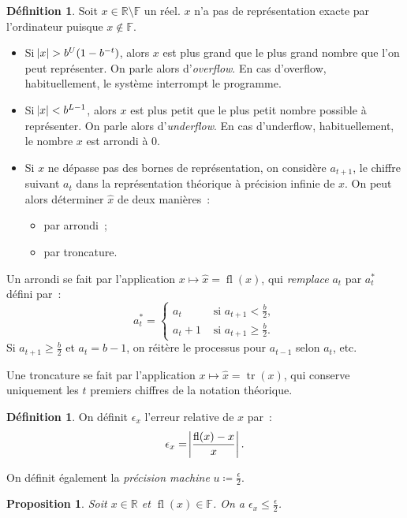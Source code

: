 \documentclass{article}
\newtheorem{prp}[thm]{Proposition}
\theoremstyle{definition}
\newtheorem{déf}[thm]{Définition}
\theoremstyle{remark}
\DeclareMathOperator{\fl}{fl}
\DeclareMathOperator{\tr}{tr}
\newcommand{\F}{\mathbb F}
\newcommand{\R}{\mathbb R}
\begin{document}
		\begin{déf} Soit $x \in \R \setminus \F$ un réel. $x$ n'a pas de représentation exacte par l'ordinateur puisque $x \not \in \F$.

		\begin{itemize}
			\item Si $\abs x > b^U(1-b^{-t})$, alors $x$ est plus grand que le plus grand nombre que l'on peut représenter. On parle alors d'\emph{overflow}.
			      En cas d'overflow, habituellement, le système interrompt le programme.
			\item Si $\abs x < b^{L-1}$, alors $x$ est plus petit que le plus petit nombre possible à représenter. On parle alors d'\emph{underflow}. En cas
			      d'underflow, habituellement, le nombre $x$ est arrondi à 0.
			\item Si $x$ ne dépasse pas des bornes de représentation, on considère $a_{t+1}$, le chiffre suivant $a_t$ dans la représentation théorique à
			      précision infinie de $x$. On peut alors déterminer $\widehat x$ de deux manières~:
				\begin{itemize}
					\item par arrondi~;
					\item par troncature.
				\end{itemize}
		\end{itemize}

		Un arrondi se fait par l'application $x \mapsto \widehat x = \fl(x)$, qui \emph{remplace} $a_t$ par $a_t^*$ défini par~:
		\[a_t^* = \begin{cases}a_t &\text{ si }a_{t+1} < \frac b2, \\ a_t + 1 &\text{ si }a_{t+1} \geq \frac b2.\end{cases}\]
		Si $a_{t+1} \geq \frac b2$ et $a_t = b-1$, on réitère le processus pour $a_{t-1}$ selon $a_t$, etc.

		Une troncature se fait par l'application $x \mapsto \widehat x = \tr(x)$, qui conserve uniquement les $t$ premiers chiffres de la notation théorique.
		\end{déf}

		\begin{déf} On définit $\epsilon_x$ l'erreur relative de $x$ par~:
		\[\epsilon_x = \abs {\frac {\fl(x)-x}x}.\]

		On définit également la \emph{précision machine} $u \coloneqq \frac \epsilon2$.
		\end{déf}

		\begin{prp} Soit $x \in \R$ et $\fl(x) \in \F$. On a $\epsilon_x \leq \frac \epsilon2$. \end{prp}
\end{document}

